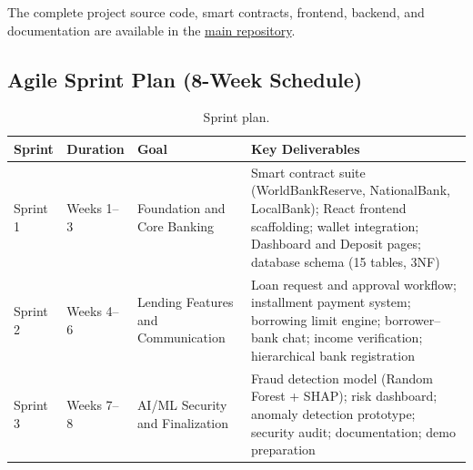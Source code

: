 \documentclass[11pt,a4paper]{article}
\newcommand{\tableheadfont}{\bfseries\small\color{PrimaryBlue}}
\newenvironment{moderntable}[1][H]{%
    \begin{table}[#1]\centering\small%
    \renewcommand{\arraystretch}{1.35}%
}{%
    \end{table}%
}
\begin{document}
\begin{tcolorbox}
\begin{center}
\end{center}
\end{tcolorbox}
\vspace{8pt}

The complete project source code, smart contracts, frontend, backend, and documentation are available in the \href{https://github.com/Yuvraajrahman/Cryto-World-Bank/tree/main}{main repository}.

\subsection{Agile Sprint Plan (8-Week Schedule)}

\begin{moderntable}
\caption{Sprint plan.}
\begin{tabular}{@{} >{\raggedright}p{1.2cm} >{\raggedright}p{1.5cm} >{\raggedright}p{2.2cm} >{\raggedright\arraybackslash}p{7cm} @{}}
\toprule
\tableheadfont Sprint & \tableheadfont Duration & \tableheadfont Goal & \tableheadfont Key Deliverables \\
\midrule
\rowcolor{RowShade}
Sprint 1 & Weeks 1--3 & Foundation and Core Banking & Smart contract suite (WorldBankReserve, NationalBank, LocalBank); React frontend scaffolding; wallet integration; Dashboard and Deposit pages; database schema (15 tables, 3NF) \\
Sprint 2 & Weeks 4--6 & Lending Features and Communication & Loan request and approval workflow; installment payment system; borrowing limit engine; borrower--bank chat; income verification; hierarchical bank registration \\
\rowcolor{RowShade}
Sprint 3 & Weeks 7--8 & AI/ML Security and Finalization & Fraud detection model (Random Forest + SHAP); risk dashboard; anomaly detection prototype; security audit; documentation; demo preparation \\
\bottomrule
\end{tabular}
\end{moderntable}
\end{document}
